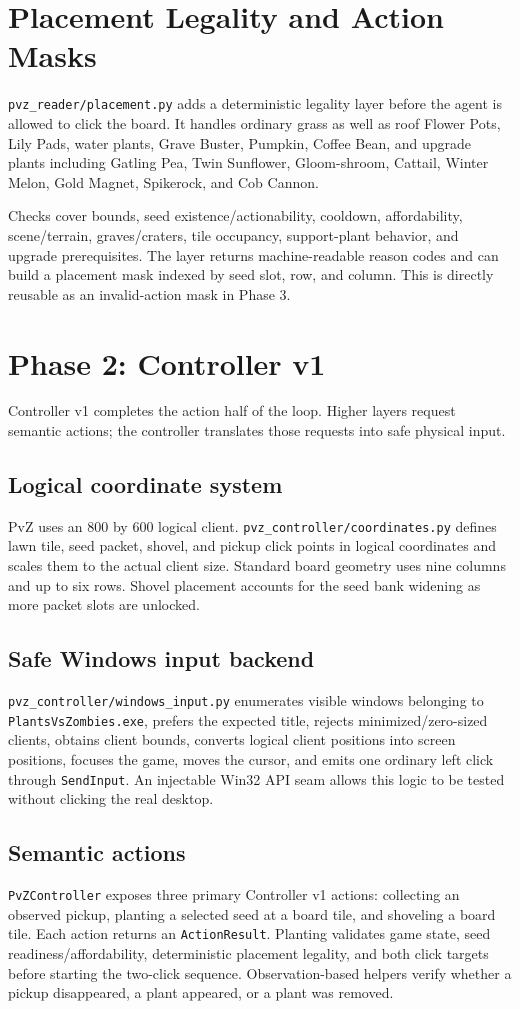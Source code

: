 \documentclass[11pt,a4paper]{article}
\begin{document}
\section{Placement Legality and Action Masks}
\texttt{pvz\_reader/placement.py} adds a deterministic legality layer before the agent is allowed to click the board. It handles ordinary grass as well as roof Flower Pots, Lily Pads, water plants, Grave Buster, Pumpkin, Coffee Bean, and upgrade plants including Gatling Pea, Twin Sunflower, Gloom-shroom, Cattail, Winter Melon, Gold Magnet, Spikerock, and Cob Cannon.

Checks cover bounds, seed existence/actionability, cooldown, affordability, scene/terrain, graves/craters, tile occupancy, support-plant behavior, and upgrade prerequisites. The layer returns machine-readable reason codes and can build a placement mask indexed by seed slot, row, and column. This is directly reusable as an invalid-action mask in Phase 3.
\section{Phase 2: Controller v1}
Controller v1 completes the action half of the loop. Higher layers request semantic actions; the controller translates those requests into safe physical input.
\subsection{Logical coordinate system}
PvZ uses an 800 by 600 logical client. \texttt{pvz\_controller/coordinates.py} defines lawn tile, seed packet, shovel, and pickup click points in logical coordinates and scales them to the actual client size. Standard board geometry uses nine columns and up to six rows. Shovel placement accounts for the seed bank widening as more packet slots are unlocked.
\subsection{Safe Windows input backend}
\texttt{pvz\_controller/windows\_input.py} enumerates visible windows belonging to \texttt{PlantsVsZombies.exe}, prefers the expected title, rejects minimized/zero-sized clients, obtains client bounds, converts logical client positions into screen positions, focuses the game, moves the cursor, and emits one ordinary left click through \texttt{SendInput}. An injectable Win32 API seam allows this logic to be tested without clicking the real desktop.
\subsection{Semantic actions}
\texttt{PvZController} exposes three primary Controller v1 actions: collecting an observed pickup, planting a selected seed at a board tile, and shoveling a board tile. Each action returns an \texttt{ActionResult}. Planting validates game state, seed readiness/affordability, deterministic placement legality, and both click targets before starting the two-click sequence. Observation-based helpers verify whether a pickup disappeared, a plant appeared, or a plant was removed.
\end{document}
